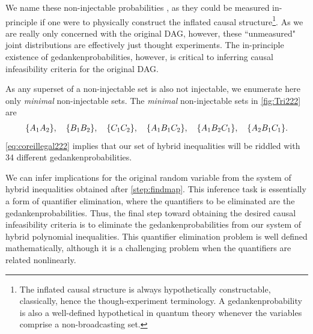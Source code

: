 {We name these non-injectable probabilities , as they could be measured in-principle if one were to physically construct the inflated causal structure\footnote{The inflated causal structure is always hypothetically constructable, classically, hence the though-experiment terminology. A gedankenprobability is also a well-defined hypothetical in quantum theory whenever the variables comprise a non-broadcasting set.}. As we are really only concerned with the original DAG, however, these ``unmeasured" joint distributions are effectively just thought experiments. The in-principle existence of gedankenprobabilities, however, is critical to inferring causal infeasibility criteria for the original DAG. 

As any superset of a non-injectable set is also not injectable, we enumerate here only \emph{minimal} non-injectable sets. The \emph{minimal} non-injectable sets in \cref{fig:Tri222} are
\begin{align}\label{eq:coreillegal222}
    \brackets{A_1 A_2},\quad\brackets{B_1 B_2},\quad\brackets{C_1 C_2},\quad\brackets{A_1 B_1 C_2},\quad\brackets{A_1 B_2 C_1},\quad\brackets{A_2 B_1 C_1}.
\end{align}
\cref{eq:coreillegal222} implies that our set of hybrid inequalities will be riddled with 34 different gedankenprobabilities.


\label{step:elimination}\par\smallskip\nobreak
We can infer implications for the original random variable from the system of hybrid inequalities obtained after \cref{step:findmap}. This inference task is essentially a form of quantifier elimination, where the quantifiers to be eliminated are the gedankenprobabilities. 
Thus, the final step toward obtaining the desired causal infeasibility criteria is to eliminate the gedankenprobabilities from our system of hybrid polynomial inequalities. This quantifier elimination problem is well defined mathematically, although it is a challenging problem when the quantifiers are related nonlinearly. 

}
